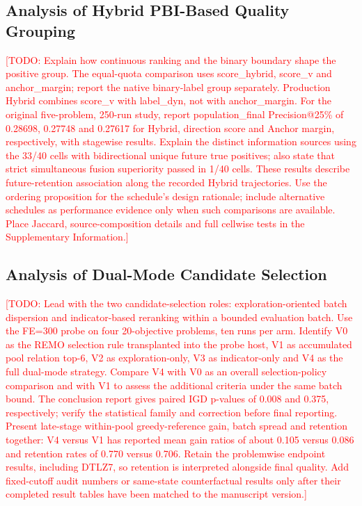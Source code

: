 \documentclass[final,5p,times,twocolumn]{elsarticle}
\newcommand{\TODO}[1]{\textcolor{red}{[TODO: #1]}}
\begin{document}
\subsection{Analysis of Hybrid PBI-Based Quality Grouping}
\label{sec:exp:hpc}
\TODO{Explain how continuous ranking and the binary boundary shape
the positive group. The equal-quota comparison uses score\_hybrid, score\_v and
anchor\_margin; report the native binary-label group separately. Production
Hybrid combines score\_v with label\_dyn, not with anchor\_margin.
For the original five-problem, 250-run study, report population\_final
Precision@25\% of 0.28698, 0.27748 and 0.27617 for Hybrid, direction score and
Anchor margin, respectively, with stagewise results. Explain the distinct
information sources using the 33/40 cells with bidirectional unique future true
positives; also state that strict simultaneous fusion superiority passed in
1/40 cells. These results describe future-retention association along the
recorded Hybrid trajectories. Use the ordering proposition for the schedule's
design rationale; include alternative schedules as performance evidence only
when such comparisons are available. Place Jaccard, source-composition details
and full cellwise tests in the Supplementary Information.}

\subsection{Analysis of Dual-Mode Candidate Selection}
\label{sec:exp:candidate}
\TODO{Lead with the two candidate-selection roles: exploration-oriented batch
dispersion and indicator-based reranking within a bounded evaluation batch.
Use the FE=300 probe on four 20-objective problems, ten runs per arm. Identify
V0 as the REMO selection rule transplanted into the probe host, V1 as accumulated
pool relation top-$6$, V2 as exploration-only, V3 as indicator-only and V4 as
the full dual-mode strategy. Compare V4 with V0 as an overall selection-policy
comparison and with V1 to assess the additional criteria under the same batch
bound. The conclusion report gives paired IGD p-values of 0.008 and 0.375,
respectively; verify the statistical family and correction before final reporting.
Present late-stage within-pool greedy-reference gain, batch spread and retention
together: V4 versus V1 has reported mean gain ratios of about 0.105 versus 0.086
and retention rates of 0.770 versus 0.706. Retain the problemwise endpoint
results, including DTLZ7, so retention is interpreted alongside final quality.
Add fixed-cutoff audit numbers or same-state counterfactual results only after
their completed result tables have been matched to the manuscript version.}
\end{document}
